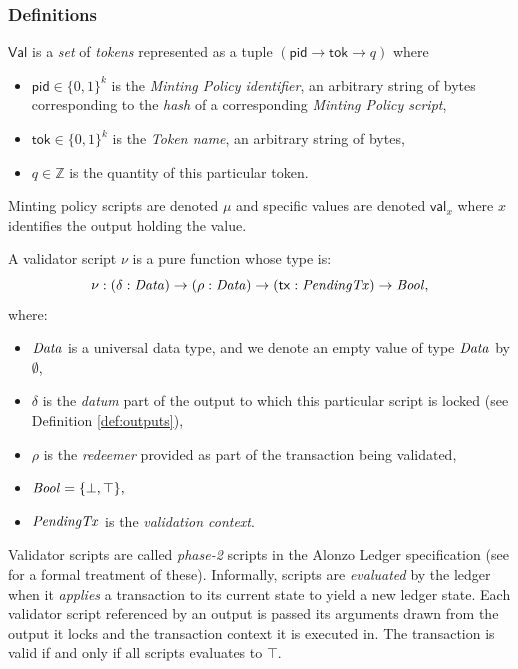 \subsubsection{Definitions}

\begin{definition}[Values]

$\mathsf{Val}$ is a \emph{set} of \emph{tokens} represented as a tuple $(\mathsf{pid} \rightarrow \mathsf{tok} \rightarrow q)$ where
\begin{itemize}
    \item $\mathsf{pid} \in \{0,1\}^k$ is the \emph{Minting Policy identifier}, an arbitrary string of bytes corresponding to the \emph{hash} of a corresponding \emph{Minting Policy script},
    \item $\mathsf{tok} \in \{0,1\}^k$ is the \emph{Token name}, an arbitrary string of bytes,
    \item $q \in \mathbb{Z}$ is the quantity of this particular token.
\end{itemize}
Minting policy scripts are denoted $\mu$ and specific values are denoted $\mathsf{val}_{x}$ where $x$ identifies the output holding the value.
\end{definition}

\begin{definition}
A validator script $\nu$ is a pure function whose type is:
\[
  \nu : (\delta : \mathit{Data}) \to (\rho : \mathit{Data}) \to (\mathsf{tx} : \mathit{PendingTx})
  \to\mathit{Bool},
\]
where: 
\begin{itemize}
    \item $\mathit{Data}$ is a universal data type, and we denote an empty value of type $\mathit{Data}$ by $\emptyset$,  
    \item $\delta$ is the \emph{datum} part of the output to which this particular script is locked (see Definition \ref{def:outputs}),
    \item $\rho$ is the \emph{redeemer} provided as part of the transaction being validated,
    \item $\mathit{Bool} = \{\bot, \top\},$
    \item $\mathit{PendingTx}$ is the \emph{validation context}.
\end{itemize}
\end{definition}

Validator scripts are called \emph{phase-2} scripts in the Alonzo Ledger specification (see \cite{alozon-spec} for a formal treatment of these). Informally, scripts are \emph{evaluated} by the ledger when it \emph{applies} a transaction to its current state to yield a new ledger state. Each validator script referenced by an output is passed its arguments drawn from the output it locks and the transaction context it is executed in. The transaction is valid if and only if all scripts evaluates to $\top.$

